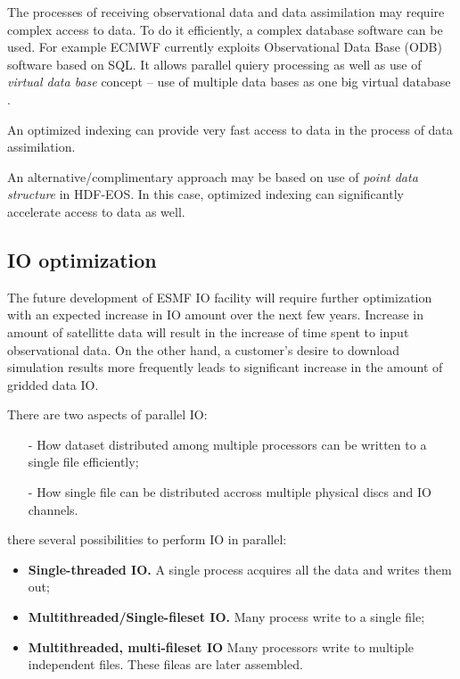 The processes of receiving observational data and data assimilation
may require complex access to data. To do it efficiently, a complex
database software can be used. For example ECMWF currently exploits
Observational Data Base (ODB) software based on SQL. It allows
parallel quiery processing as well as use of {\em virtual data base}
concept -- use of multiple data bases as one big virtual database
\cite{ODB}. 

An optimized indexing can provide very fast access to data in the
process of data assimilation.


An alternative/complimentary approach may be based on use of {\em
point data structure} in HDF-EOS. In this case, optimized indexing can
significantly accelerate access to data as well.



\subsection{IO optimization}

The future development of ESMF IO facility will require further
optimization with an expected increase in IO amount over the next few
years. Increase in amount of satellitte data will result in the
increase of time spent to input observational data. On the other hand,
a customer's desire to download simulation results more frequently leads
to significant increase in the amount of gridded data IO.

There are two aspects of  parallel IO:

\begin{itemize}
\item[-] How dataset distributed among multiple processors can be
written to a single file efficiently;

\item[-] How single file can be distributed accross multiple physical
discs and IO channels.
\end{itemize}
 
there several possibilities to perform IO in parallel:
\begin{itemize}
\item {\bf Single-threaded IO.} A single process acquires all the data and
                                writes them out; 
\item {\bf Multithreaded/Single-fileset IO.} Many process write to a
single file;

\item {\bf Multithreaded, multi-fileset IO} Many processors write to
multiple independent files. These fileas are later assembled. 
\end{itemize}

